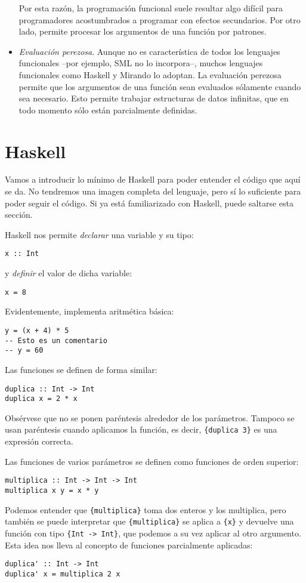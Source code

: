 \documentclass[12pt, twoside]{book}
\newcommand{\code}[1]{\Verb+{#1}+}
\begin{document}
\begin{itemize}
  Por esta razón, la programación funcional suele resultar algo difícil para programadores acostumbrados a programar con efectos secundarios.
  Por otro lado, permite procesar los argumentos de una función por patrones.

  \item \emph{Evaluación perezosa}. Aunque no es característica de todos los lenguajes funcionales --por ejemplo, SML no lo incorpora--, muchos lenguajes funcionales como Haskell y Mirando lo adoptan.
  La evaluación perezosa permite que los argumentos de una función sean evaluados sólamente cuando sea necesario.
  Esto permite trabajar estructuras de datos infinitas, que en todo momento sólo están parcialmente definidas.
\end{itemize}

\section{Haskell}
Vamos a introducir lo mínimo de Haskell para poder entender el código que aquí se da.
No tendremos una imagen completa del lenguaje, pero sí lo suficiente para poder seguir el código.
Si ya está familiarizado con Haskell, puede saltarse esta sección.

Haskell nos permite \emph{declarar} una variable y su tipo:
\begin{verbatim}
x :: Int
\end{verbatim}
y \emph{definir} el valor de dicha variable:
\begin{verbatim}
x = 8
\end{verbatim}
Evidentemente, implementa aritmética básica:
\begin{verbatim}
y = (x + 4) * 5
-- Esto es un comentario
-- y = 60
\end{verbatim}
Las funciones se definen de forma similar:
\begin{verbatim}
duplica :: Int -> Int
duplica x = 2 * x
\end{verbatim}
Obsérvese que no se ponen paréntesis alrededor de los parámetros.
Tampoco se usan paréntesis cuando aplicamos la función, es decir, \code{duplica 3} es una expresión correcta.

Las funciones de varios parámetros se definen como funciones de orden superior:
\begin{verbatim}
multiplica :: Int -> Int -> Int
multiplica x y = x * y
\end{verbatim}
Podemos entender que \code{multiplica} toma dos enteros y los multiplica, pero también se puede interpretar que \code{multiplica} se aplica a \code{x} y devuelve una función con tipo \code{Int -> Int}, que podemos a su vez aplicar al otro argumento.
Esta idea nos lleva al concepto de funciones parcialmente aplicadas:
\begin{verbatim}
duplica' :: Int -> Int
duplica' x = multiplica 2 x
\end{verbatim}
\end{document}
